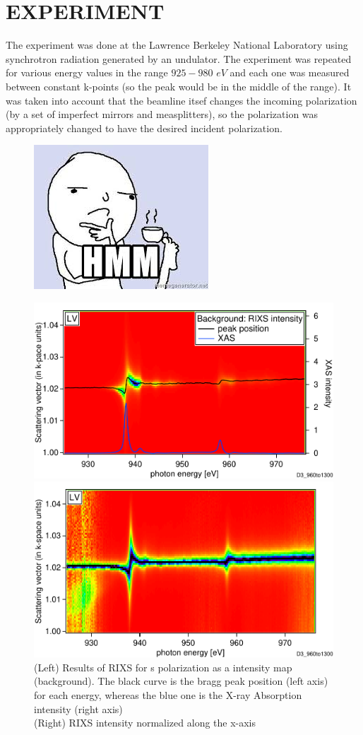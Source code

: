 \documentclass[twocolumn,amsmath,superscriptaddress,amssymb]{revtex4-1}
\begin{document}
\section{EXPERIMENT}
The experiment was done at the Lawrence Berkeley National Laboratory using synchrotron radiation generated by an undulator. The experiment was repeated for various energy values in the range $925-980$ $eV$ and each one was measured between constant k-points (so the peak would be in the middle of the range). It was taken into account that the beamline itsef changes the incoming polarization (by a set of imperfect mirrors and measplitters), so the polarization was appropriately changed to have the desired incident polarization.
\begin{figure}[h]
	\includegraphics[width = 0.5\columnwidth, height = 2.5 cm]{hmm.jpg}
\end{figure}
%
\begin{figure}
	\begin{minipage}[bh!]{\columnwidth}
		\includegraphics[width = \textwidth, height = 3.6 cm]{./RIXS/LV(960).pdf}
	\end{minipage}
	\hfill
	\begin{minipage}[bh!]{\columnwidth}
		\includegraphics[width = \textwidth, height = 3.6 cm]{./RIXS/LV(960)norm.pdf}
	\end{minipage}
	\caption{(Left) Results of RIXS for s polarization as a intensity map (background). The black curve is the bragg peak position (left axis) for each energy, whereas the blue one is the    X-ray Absorption intensity (right axis)\\  
\noindent (Right) RIXS intensity normalized along the x-axis}
	\label{RIXS_LV}
\end{figure}
\end{document}
